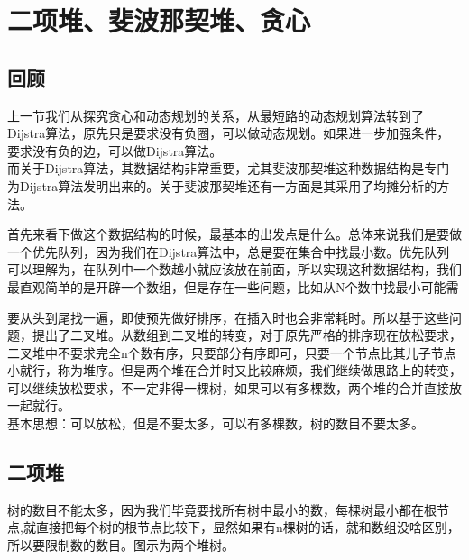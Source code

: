 \chapter{二项堆、斐波那契堆、贪心}

\section{回顾}
上一节我们从探究贪心和动态规划的关系，从最短路的动态规划算法转到了Dijstra算法，原先只是要求没有负圈，可以做动态规划。如果进一步加强条件，要求没有负的边，可以做Dijstra算法。 \\
而关于Dijstra算法，其数据结构非常重要，尤其斐波那契堆这种数据结构是专门为Dijstra算法发明出来的。关于斐波那契堆还有一方面是其采用了均摊分析的方法。

首先来看下做这个数据结构的时候，最基本的出发点是什么。总体来说我们是要做一个优先队列，因为我们在Dijstra算法中，总是要在集合中找最小数。优先队列可以理解为，在队列中一个数越小就应该放在前面，所以实现这种数据结构，我们最直观简单的是开辟一个数组，但是存在一些问题，比如从N个数中找最小可能需

要从头到尾找一遍，即使预先做好排序，在插入时也会非常耗时。所以基于这些问题，提出了二叉堆。从数组到二叉堆的转变，对于原先严格的排序现在放松要求，二叉堆中不要求完全n个数有序，只要部分有序即可，只要一个节点比其儿子节点小就行，称为堆序。但是两个堆在合并时又比较麻烦，我们继续做思路上的转变，可以继续放松要求，不一定非得一棵树，如果可以有多棵数，两个堆的合并直接放一起就行。\\
基本思想：可以放松，但是不要太多，可以有多棵数，树的数目不要太多。

\section{二项堆}
树的数目不能太多，因为我们毕竟要找所有树中最小的数，每棵树最小都在根节点,就直接把每个树的根节点比较下，显然如果有n棵树的话，就和数组没啥区别，所以要限制数的数目。图示为两个堆树。
\begin{figure}[h!]
\centering
{}
\end{figure} 

